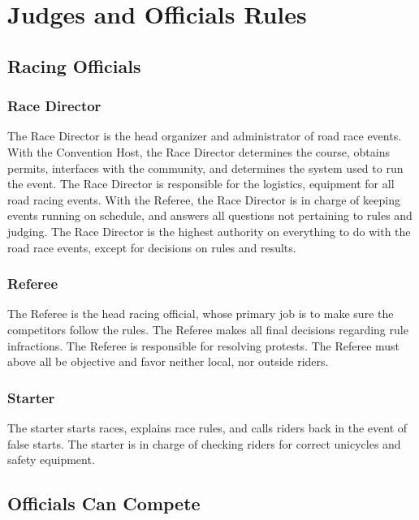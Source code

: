 \chapter{Judges and Officials Rules}

\section{Racing Officials}

\subsection{Race Director}

The Race Director is the head organizer and administrator of road race events.
With the Convention Host, the Race Director determines the course, obtains permits, interfaces with the community, and determines the system used to run the event.
The Race Director is responsible for the logistics, equipment for all road racing events.
With the Referee, the Race Director is in charge of keeping events running on schedule, and answers all questions not pertaining to rules and judging.
The Race Director is the highest authority on everything to do with the road race events, except for decisions on rules and results.

\subsection{Referee}

The Referee is the head racing official, whose primary job is to make sure the competitors follow the rules.
The Referee makes all final decisions regarding rule infractions.
The Referee is responsible for resolving protests.
The Referee must above all be objective and favor neither local, nor outside riders.

\subsection{Starter}

The starter starts races, explains race rules, and calls riders back in the event of false starts.
The starter is in charge of checking riders for correct unicycles and safety equipment.

\section{Officials Can Compete}

